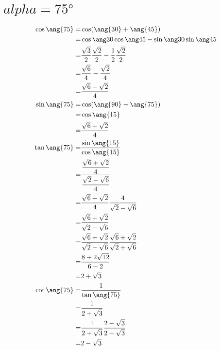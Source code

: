 \section{$alpha=\ang{75}$}
\begin{align*}
\cos\ang{75}=&\cos(\ang{30}+\ang{45})\\
=&\sumcos{30}{45}\\
=&\costrenta\cosquarantacinque-\sintrenta\sinquarantecinque\\
=&\dfrac{\sqrt{6}}{4}-\dfrac{\sqrt{2}}{4}\\
=&\dfrac{\sqrt{6}-\sqrt{2}}{4}\\
\sin\ang{75}=&\cos(\ang{90}-\ang{75})\\
=&\cos\ang{15}\\
=&\dfrac{\sqrt{6}+\sqrt{2}}{4}\\
\tan\ang{75}=&\dfrac{\sin\ang{15}}{\cos\ang{15}}\\
=&\dfrac{\dfrac{\sqrt{6}+\sqrt{2}}{4}}{\dfrac{\sqrt{2}-\sqrt{6}}{4}}\\
=&\dfrac{\sqrt{6}+\sqrt{2}}{4}\dfrac{4}{\sqrt{2}-\sqrt{6}}\\
=&\dfrac{\sqrt{6}+\sqrt{2}}{\sqrt{2}-\sqrt{6}}\\
=&\dfrac{\sqrt{6}+\sqrt{2}}{\sqrt{2}-\sqrt{6}}\dfrac{\sqrt{6}+\sqrt{2}}{\sqrt{2}+\sqrt{6}}\\
=&\dfrac{8+2\sqrt{12}}{6-2}\\
=&2+\sqrt{3}\\
\cot\ang{75}=&\dfrac{1}{\tan\ang{75}}\\
=&\dfrac{1}{2+\sqrt{3}}\\
=&\dfrac{1}{2+\sqrt{3}}\dfrac{2-\sqrt{3}}{2-\sqrt{3}}\\
=&2-\sqrt{3}\\
\end{align*}
